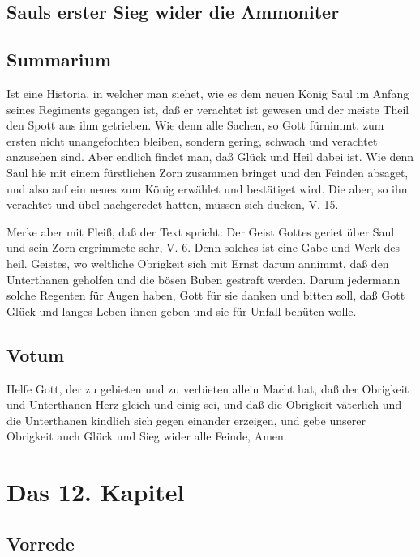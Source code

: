 \section{Sauls erster Sieg wider die Ammoniter}

\section{Summarium}

Ist eine Historia, in welcher man siehet, wie es dem neuen König Saul im Anfang seines Regiments gegangen ist, daß er verachtet ist gewesen und der meiste Theil den Spott aus ihm getrieben. Wie denn alle Sachen, so Gott fürnimmt, zum ersten nicht unangefochten bleiben, sondern gering, schwach und verachtet anzusehen sind. Aber endlich findet man, daß Glück und Heil dabei ist. Wie denn Saul hie mit einem fürstlichen Zorn zusammen bringet und den Feinden absaget, und also auf ein neues zum König erwählet und bestätiget wird. Die aber, so ihn verachtet und übel nachgeredet hatten, müssen sich ducken, V. 15.

Merke aber mit Fleiß, daß der Text spricht: Der Geist Gottes geriet über Saul und sein Zorn ergrimmete sehr, V. 6. Denn solches ist eine Gabe und Werk des heil. Geistes, wo weltliche Obrigkeit sich mit Ernst darum annimmt, daß den Unterthanen geholfen und die bösen Buben gestraft werden. Darum jedermann solche Regenten für Augen haben, Gott für sie danken und bitten soll, daß Gott Glück und langes Leben ihnen geben und sie für Unfall behüten wolle.

\section{Votum}

Helfe Gott, der zu gebieten und zu verbieten allein Macht hat, daß der Obrigkeit und Unterthanen Herz gleich und einig sei, und daß die Obrigkeit väterlich und die Unterthanen kindlich sich gegen einander erzeigen, und gebe unserer Obrigkeit auch Glück und Sieg wider alle Feinde, Amen.

\chapter{Das 12. Kapitel}

\section{Vorrede}

